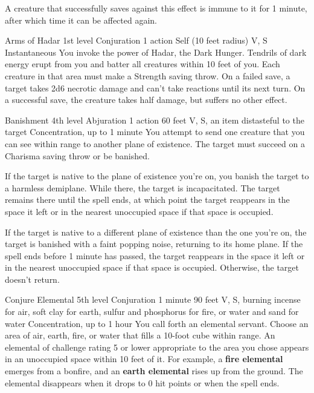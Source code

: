 \documentclass[10pt,a4paper,twoside,bg=print,twocolumn,openany,nodeprecatedcode]{dndbook}
\begin{document}
A creature that successfully saves against this effect is immune to it for 1 minute, after which time it can be affected again.



\DndSpellHeader%
{Arms of Hadar}
{1st level Conjuration}
{1 action}
{Self (10 feet radius)}
{V, S}
{Instantaneous}
You invoke the power of Hadar, the Dark Hunger. Tendrils of dark energy erupt from you and batter all creatures within 10 feet of you. Each creature in that area must make a Strength saving throw. On a failed save, a target takes 2d6 necrotic damage and can't take reactions until its next turn. On a successful save, the creature takes half damage, but suffers no other effect.



\DndSpellHeader%
{Banishment}
{4th level Abjuration}
{1 action}
{60 feet}
{V, S, an item distasteful to the target}
{Concentration, up to 1 minute}
You attempt to send one creature that you can see within range to another plane of existence. The target must succeed on a Charisma saving throw or be banished.

If the target is native to the plane of existence you're on, you banish the target to a harmless demiplane. While there, the target is incapacitated. The target remains there until the spell ends, at which point the target reappears in the space it left or in the nearest unoccupied space if that space is occupied.

If the target is native to a different plane of existence than the one you're on, the target is banished with a faint popping noise, returning to its home plane. If the spell ends before 1 minute has passed, the target reappears in the space it left or in the nearest unoccupied space if that space is occupied. Otherwise, the target doesn't return.



\DndSpellHeader%
{Conjure Elemental}
{5th level Conjuration}
{1 minute}
{90 feet}
{V, S, burning incense for air, soft clay for earth, sulfur and phosphorus for fire, or water and sand for water}
{Concentration, up to 1 hour}
You call forth an elemental servant. Choose an area of air, earth, fire, or water that fills a 10-foot cube within range. An elemental of challenge rating 5 or lower appropriate to the area you chose appears in an unoccupied space within 10 feet of it. For example, a \textbf{fire elemental} emerges from a bonfire, and an \textbf{earth elemental} rises up from the ground. The elemental disappears when it drops to 0 hit points or when the spell ends.
\end{document}
